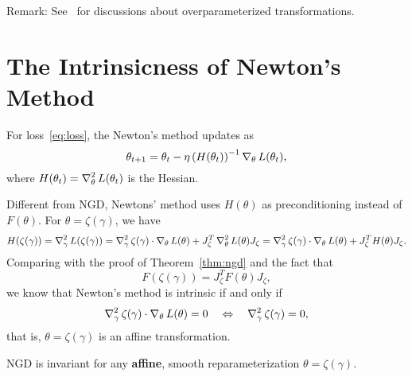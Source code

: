 \documentclass{article}
\begin{document}
Remark: See~\cite{liang2017fisher} for discussions about overparameterized transformations.

\section{The Intrinsicness of Newton's Method}
\begin{defi}
For loss~\eqref{eq:loss}, the Newton's method updates as
\begin{equation}
    \theta_{t+1} = \theta_t - \eta \left(H(\theta_t)\right)^{-1} \operatorname{\nabla}_{\theta} L(\theta_t),
\end{equation}
where $H(\theta_t) = \operatorname{\nabla}_{\theta}^2L(\theta_t)$ is the Hessian.
\end{defi}
Different from NGD, Newtons' method uses $H(\theta)$ as preconditioning instead of $F(\theta)$.
For $\theta = \zeta(\gamma)$, we have
\begin{equation}
    H(\zeta(\gamma)) = \operatorname{\nabla}_{\gamma}^2 L(\zeta(\gamma)) = \operatorname{\nabla}_{\gamma}^2 \zeta(\gamma) \cdot \operatorname{\nabla}_{\theta} L(\theta) + J_{\zeta}^T \operatorname{\nabla}_{\theta}^2 L(\theta) J_{\zeta} = \operatorname{\nabla}_{\gamma}^2 \zeta(\gamma) \cdot \operatorname{\nabla}_{\theta} L(\theta) + J_{\zeta}^T H(\theta) J_{\zeta}.
\end{equation}
Comparing with the proof of Theorem~\ref{thm:ngd} and the fact that
\begin{equation}
    F(\zeta(\gamma)) = J_{\zeta}^T F(\theta) J_{\zeta},
\end{equation}
we know that Newton's method is intrinsic if and only if
\begin{equation}
    \operatorname{\nabla}_{\gamma}^2 \zeta(\gamma) \cdot \operatorname{\nabla}_{\theta} L(\theta) = 0 \quad \Leftrightarrow \quad \operatorname{\nabla}_{\gamma}^2 \zeta(\gamma) = 0,
\end{equation}
that is, $\theta = \zeta(\gamma)$ is an affine transformation.

\begin{thm}\label{thm:newton}
NGD is invariant for any \textbf{affine}, smooth reparameterization $\theta = \zeta (\gamma)$.
\end{thm}




\end{document}
